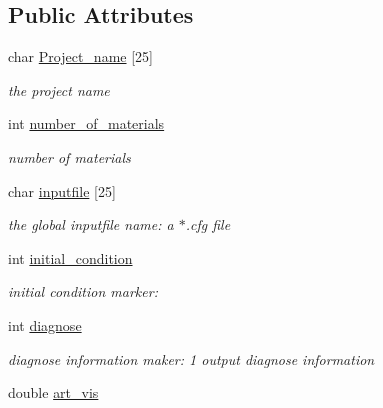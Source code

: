 \subsection*{Public Attributes}
\begin{CompactItemize}
\item 
\hypertarget{classInitiation_d011ce1385a1cd46fb500d9a62de6883}{
char \hyperlink{classInitiation_d011ce1385a1cd46fb500d9a62de6883}{Project\_\-name} \mbox{[}25\mbox{]}}
\label{classInitiation_d011ce1385a1cd46fb500d9a62de6883}

\begin{CompactList}\small\item\em the project name \item\end{CompactList}\item 
int \hyperlink{classInitiation_ac12d75613f51d4a10a3f28887be0821}{number\_\-of\_\-materials}
\begin{CompactList}\small\item\em number of materials \item\end{CompactList}\item 
\hypertarget{classInitiation_3f9f020a489c9179885c02c867e77ef0}{
char \hyperlink{classInitiation_3f9f020a489c9179885c02c867e77ef0}{inputfile} \mbox{[}25\mbox{]}}
\label{classInitiation_3f9f020a489c9179885c02c867e77ef0}

\begin{CompactList}\small\item\em the global inputfile name: a $\ast$.cfg file \item\end{CompactList}\item 
int \hyperlink{classInitiation_1bbced7f2136569c065e0f5c874c6cff}{initial\_\-condition}
\begin{CompactList}\small\item\em initial condition marker: \item\end{CompactList}\item 
\hypertarget{classInitiation_b9979da1d25141fa58f79393232b0a9c}{
int \hyperlink{classInitiation_b9979da1d25141fa58f79393232b0a9c}{diagnose}}
\label{classInitiation_b9979da1d25141fa58f79393232b0a9c}

\begin{CompactList}\small\item\em diagnose information maker: 1 output diagnose information \item\end{CompactList}\item 
\hypertarget{classInitiation_115596cc83b34b6f75031c5e5b0c3fe7}{
double \hyperlink{classInitiation_115596cc83b34b6f75031c5e5b0c3fe7}{art\_\-vis}}
\label{classInitiation_115596cc83b34b6f75031c5e5b0c3fe7}


\end{CompactItemize}
